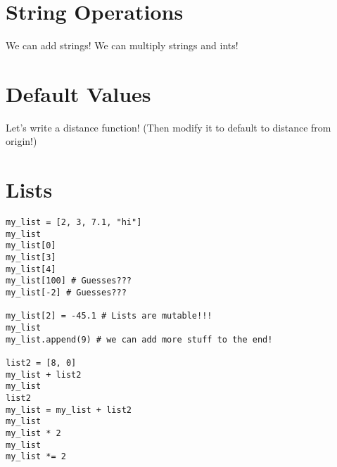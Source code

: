 \documentclass[12pt]{article}
\begin{document}
\section*{String Operations}

We can add strings!  We can multiply strings and ints!

\section{Default Values}

Let's write a distance function!  (Then modify it to default to distance from
origin!)





\section*{Lists}

\begin{lstlisting}
my_list = [2, 3, 7.1, "hi"]
my_list
my_list[0]
my_list[3]
my_list[4]
my_list[100] # Guesses???
my_list[-2] # Guesses???

my_list[2] = -45.1 # Lists are mutable!!!
my_list
my_list.append(9) # we can add more stuff to the end!

list2 = [8, 0]
my_list + list2
my_list
list2
my_list = my_list + list2
my_list
my_list * 2
my_list
my_list *= 2
\end{lstlisting}
\end{document}
